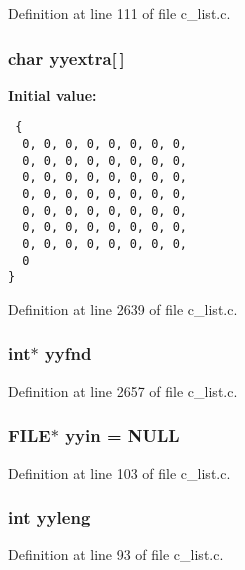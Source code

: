 Definition at line 111 of file c\_\-list.c.
\subsubsection{\setlength{\rightskip}{0pt plus 5cm}char \bf{yyextra}[$\,$]}\label{c__list_8c_eb421468715aed80be580763fa9d99b8}


\textbf{Initial value:}

\begin{Code}\begin{verbatim} {
  0, 0, 0, 0, 0, 0, 0, 0,
  0, 0, 0, 0, 0, 0, 0, 0,
  0, 0, 0, 0, 0, 0, 0, 0,
  0, 0, 0, 0, 0, 0, 0, 0,
  0, 0, 0, 0, 0, 0, 0, 0,
  0, 0, 0, 0, 0, 0, 0, 0,
  0, 0, 0, 0, 0, 0, 0, 0,
  0
}
\end{verbatim}\end{Code}


Definition at line 2639 of file c\_\-list.c.
\subsubsection{\setlength{\rightskip}{0pt plus 5cm}int$\ast$ \bf{yyfnd}}\label{c__list_8c_51dfeda0833f16663c3597f98752ba7f}




Definition at line 2657 of file c\_\-list.c.
\subsubsection{\setlength{\rightskip}{0pt plus 5cm}FILE$\ast$ \bf{yyin} = NULL}\label{c__list_8c_46af646807e0797e72b6e8945e7ea88b}




Definition at line 103 of file c\_\-list.c.
\subsubsection{\setlength{\rightskip}{0pt plus 5cm}int \bf{yyleng}}\label{c__list_8c_1b5865350b5ca5c1d69f429c2a652953}




Definition at line 93 of file c\_\-list.c.
